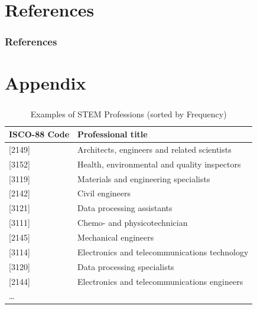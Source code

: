 \documentclass[11pt, aspectratio=1610, xcolor={dvipsnames}]{beamer}
\begin{document}
	\section*{References}
	\begin{frame}[allowframebreaks]
		\frametitle{References}
		
		{\scriptsize
		
		}
		
	\end{frame}
	
	\appendix
	
	\section{Appendix}
		\begin{frame}
		\frametitle{}
		
		{\linespread{1}\small
			\begin{table}[h]
				\centering
				\caption{Examples of STEM Professions (sorted by Frequency)}
				\label{tab:stem_examples}
				
				\begin{tabular}{ll}
					\toprule
					ISCO-88 Code & Professional title\\
					\midrule
					{[2149]} & Architects, engineers and related scientists\\
					{[3152]} & Health, environmental and quality inspectors\\
					{[3119]} & Materials and engineering specialists\\
					{[2142]} & Civil engineers\\
					{[3121]} & Data processing assistants\\
					{[3111]} & Chemo- and physicotechnician\\
					{[2145]} & Mechanical engineers\\
					{[3114]} & Electronics and telecommunications technology\\
					{[3120]} & Data processing specialists\\
					{[2144]} & Electronics and telecommunications engineers\\
					… &\\
					\bottomrule
				\end{tabular}
			\end{table}
		}
		
	\end{frame}
	
\end{document}
